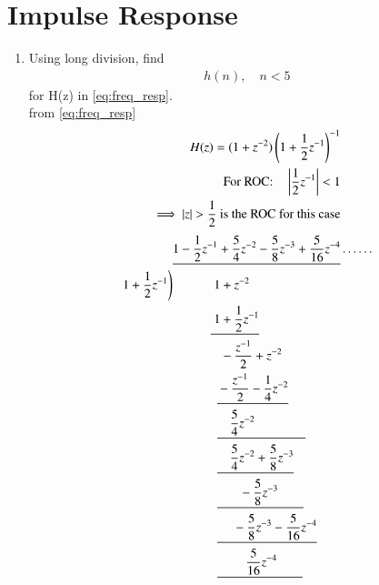 \documentclass[journal,12pt,twocolumn]{IEEEtran}
\renewcommand\thesection{\arabic{section}}
\begin{document}
	\section{Impulse Response}
	\begin{enumerate}[label=\thesection.\arabic*]
		\item Using long division, 
		find
		\begin{align}
			h(n), \quad n < 5
		\end{align}
		for H(z) in 
		\eqref{eq:freq_resp}.\\
		\solution
		from \eqref{eq:freq_resp}
		\begin{align}
			H(z) %
			= (1 + z^{-2})\brak{1+\frac{1}{2}z^{-1}}^{-1}\\
			\text{For ROC:} \quad \abs{\frac{1}{2}z^{-1}} < 1\\
			\implies \abs{z} > \frac{1}{2} \text{ is the ROC for this case}
			\end{align}
	\tiny
		\begin{align*}
			&\underline{1-\dfrac{1}{2}z^{-1}+\dfrac{5}{4}z^{-2}-\dfrac{5}{8}z^{-3}+\frac{5}{16}z^{-4}}\ldots \ldots\\
			\rbrak{1 + \dfrac{1}{2}z^{-1}} &\text{\quad}\text{\quad}\text{\quad}\text{   }\text{$1 + z^{-2}$}\\
			&\text{\quad}\text{\quad}\text{\quad}\underline{\text{ }1 + \frac{1}{2}z^{-1}}\\
			&\text{\quad}\text{\quad}\text{\quad}\text{ }\text{ }\text{ }-\frac{z^{-1}}{2}+z^{-2}\\
			&\text{\quad}\text{\quad}\text{\quad}\text{ }\text{ }\underline{\text{} -\frac{z^{-1}}{2} - \frac{1}{4}z^{-2}}\\
			&\text{\quad}\text{\quad}\text{\quad}\text{ }\text{ }\underline{\text{ }\text{ }\text{ }\text{ }\frac{5}{4}z^{-2}\text{\quad \quad \quad \quad}}\\
			&\text{\quad}\text{\quad}\text{\quad}\text{ }\text{ }\underline{\text{ }\text{ }\text{ }\text{ }\frac{5}{4}z^{-2} + \frac{5}{8}z^{-3}}\\
			&\text{\quad}\text{\quad}\text{\quad}\text{ }\text{ }\underline{\text{ }\text{ }\text{ }\text{\quad}-\frac{5}{8}z^{-3}\text{\quad}\text{\quad}}\\
			&\text{\quad}\text{\quad}\text{\quad}\text{ }\text{ }\underline{\text{ }\text{ }\text{ }\text{ }\text{ }-\frac{5}{8}z^{-3} - \frac{5}{16}z^{-4}}\\
			&\text{\quad}\text{\quad}\text{\quad}\text{ }\text{ }\underline{\text{ }\text{ }\text{ }\text{ }\text{ }\text{\quad}\frac{5}{16}z^{-4}\text{\quad}\text{\quad}}\\

\end{align*}
\end{enumerate}
\end{document}

